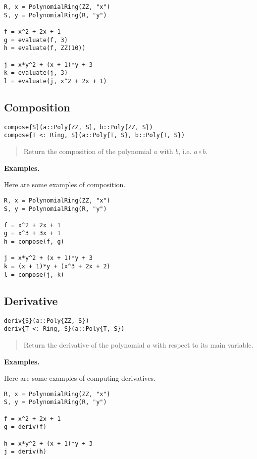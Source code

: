 \documentclass[a4paper,10pt]{article}
\newcommand{\desc}[1]{\vspace{-3mm}\begin{quote}#1\end{quote}}
\begin{document}
{{{{{{\begin{lstlisting}
R, x = PolynomialRing(ZZ, "x")
S, y = PolynomialRing(R, "y")

f = x^2 + 2x + 1
g = evaluate(f, 3)
h = evaluate(f, ZZ(10))

j = x*y^2 + (x + 1)*y + 3
k = evaluate(j, 3)
l = evaluate(j, x^2 + 2x + 1)
\end{lstlisting}

\subsection{Composition}

\begin{lstlisting}
compose{S}(a::Poly{ZZ, S}, b::Poly{ZZ, S})
compose{T <: Ring, S}(a::Poly{T, S}, b::Poly{T, S})
\end{lstlisting}

\desc{Return the composition of the polynomial $a$ with $b$, i.e. $a \circ b$.}

\textbf{Examples.}

Here are some examples of composition.

\begin{lstlisting}
R, x = PolynomialRing(ZZ, "x")
S, y = PolynomialRing(R, "y")

f = x^2 + 2x + 1
g = x^3 + 3x + 1
h = compose(f, g)

j = x*y^2 + (x + 1)*y + 3
k = (x + 1)*y + (x^3 + 2x + 2)
l = compose(j, k)
\end{lstlisting}

\subsection{Derivative}

\begin{lstlisting}
deriv{S}(a::Poly{ZZ, S})
deriv{T <: Ring, S}(a::Poly{T, S})
\end{lstlisting}

\desc{Return the derivative of the polynomial $a$ with respect to its main
variable.}

\textbf{Examples.}

Here are some examples of computing derivatives.

\begin{lstlisting}
R, x = PolynomialRing(ZZ, "x")
S, y = PolynomialRing(R, "y")

f = x^2 + 2x + 1
g = deriv(f)

h = x*y^2 + (x + 1)*y + 3
j = deriv(h)
\end{lstlisting}

}}}}}}
\end{document}
